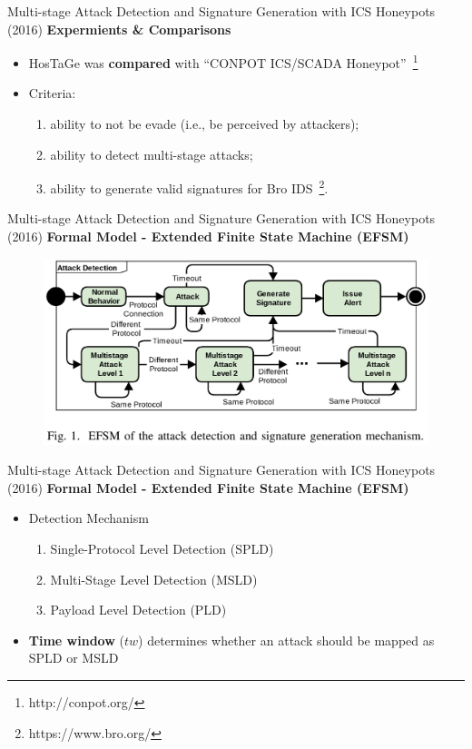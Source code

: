 \documentclass[compress]{beamer}
\begin{document}
\begin{frame}{Multi-stage Attack Detection and Signature Generation with ICS Honeypots (2016)}
    \textbf{Expermients \& Comparisons}
    \begin{itemize}
     \item HosTaGe was \textbf{compared} with ``CONPOT ICS/SCADA Honeypot''~\footnote{http://conpot.org/}
     \item Criteria:
     \begin{enumerate}
      \item ability to not be evade (i.e., be perceived by attackers);
      \item ability to detect multi-stage attacks;
      \item ability to generate valid signatures for Bro IDS~\footnote{https://www.bro.org/}.
     \end{enumerate}
    \end{itemize}
\end{frame}
\begin{frame}{Multi-stage Attack Detection and Signature Generation with ICS Honeypots (2016)}
    \textbf{Formal Model - Extended Finite State Machine (EFSM)}
    \begin{figure}
    \centering
    \includegraphics[width=1.0\textwidth]{./images/hostage-efsm.png}
    \label{fig:hostage-efsm}
    \end{figure}
\end{frame}
\begin{frame}{Multi-stage Attack Detection and Signature Generation with ICS Honeypots (2016)}
    \textbf{Formal Model - Extended Finite State Machine (EFSM)}
    \begin{itemize}
     \item Detection Mechanism
     \begin{enumerate}
      \item Single-Protocol Level Detection (SPLD)
      \item Multi-Stage Level Detection (MSLD)
      \item Payload Level Detection (PLD)
     \end{enumerate}
     \item \textbf{Time window} ($tw$) determines whether an attack should be mapped as SPLD or MSLD
    \end{itemize}
\end{frame}
\end{document}
